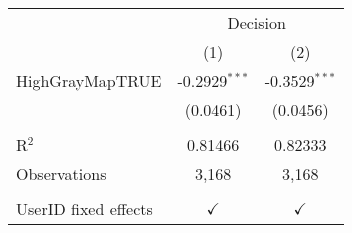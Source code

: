 \begingroup
\centering
\begin{tabular}{lcc}
   \toprule
    & \multicolumn{2}{c}{Decision}\\
                        & (1)             & (2)\\  
   \midrule 
   HighGrayMapTRUE      & -0.2929$^{***}$ & -0.3529$^{***}$\\   
                        & (0.0461)        & (0.0456)\\   
    \\
   R$^2$                & 0.81466         & 0.82333\\  
   Observations         & 3,168           & 3,168\\  
    \\
   UserID fixed effects & $\checkmark$    & $\checkmark$\\   
   \bottomrule
\end{tabular}
\par\endgroup
